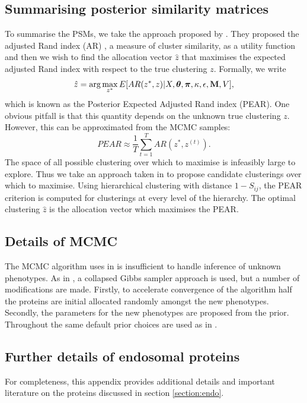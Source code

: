 \documentclass[12pt,english]{article}
\begin{document}
\subsection{Summarising posterior similarity matrices}
To summarise the PSMs, we take the approach proposed by \cite{fritsch::2009}. They proposed the adjusted Rand index (AR) \citep{rand::1971, Hubert::1985}, a measure of cluster similarity, as a utility function and then we wish to find the allocation vector $\hat{z}$ that maximises the expected adjusted Rand index with respect to the true clustering $z$. Formally, we write
\begin{equation}
\hat{z} = \arg \max_{z^*} E[AR(z^*, z)|X, \boldsymbol{\theta}, \boldsymbol{\pi} , \kappa, \epsilon, {\bf M}, V],
\end{equation}
which is known as the Posterior Expected Adjusted Rand index (PEAR). One obvious pitfall is that this quantity depends on the unknown true clustering $z$. However, this can be approximated from the MCMC samples:
\begin{equation}
PEAR \approx \frac{1}{T} \sum_{t = 1}^{T}AR(z^*, z^{(t)}).
\end{equation}
The space of all possible clustering over which to maximise is infeasibly large to explore. Thus we take an approach taken in \cite{fritsch::2009} to propose candidate clusterings over which to maximise. Using hierarchical clustering with distance $1 - S_{ij}$, the PEAR criterion is computed for clusterings at every level of the hierarchy. The optimal clustering $\hat{z}$ is the allocation vector which maximises the PEAR.
\subsection{Details of MCMC}
The MCMC algorithm uses in \cite{Crook:2018} is insufficient to handle inference of unknown phenotypes. As in \cite{Crook:2018}, a collapsed Gibbs sampler approach is used, but a number of modifications are made. Firstly, to accelerate convergence of the algorithm half the proteins are initial allocated randomly amongst the new phenotypes. Secondly, the parameters for the new phenotypes are proposed from the prior. Throughout the same default prior choices are used as in \cite{Crook:2018}.

\subsection{Further details of endosomal proteins}
For completeness, this appendix provides additional details and important literature on the proteins discussed in section \ref{section:endo}.
\end{document}
